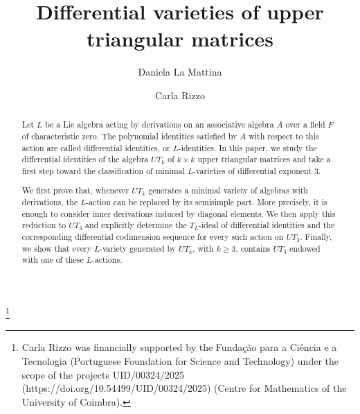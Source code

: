 \documentclass[a4paper,reqno]{amsart}
\theoremstyle{definition}
\numberwithin{equation}{section}
\numberwithin{theorem}{section}
\begin{document}
\title{Differential varieties of upper triangular matrices}

\author[D.~La~Mattina]{Daniela La Mattina}

\address{Daniela La Mattina, Dipartimento di Matematica e Informatica, Universit\'{a} degli Studi di Palermo, via
Archirafi 34, 90123, Palermo, Italy.}


\author[C.~Rizzo]{Carla Rizzo}
\address{Carla Rizzo, CMUC, Department of Mathematics, University of Coimbra, 3000-143
Coimbra, Portugal.}

 \thanks{Carla Rizzo was financially supported by the Fundação para a Ciência e a Tecnologia (Portuguese Foundation for Science and Technology) under the scope of the projects UID/00324/2025 (https://doi.org/10.54499/UID/00324/2025) (Centre for Mathematics of the University of Coimbra).}




\begin{abstract} 
Let $L$ be a Lie algebra acting by derivations on an associative algebra $A$ over a field $F$ of characteristic zero. The polynomial identities satisfied by $A$ with respect to this action are called differential identities, or $L$-identities. In this paper, we study the differential identities of the algebra $UT_k$ of $k\times k$ upper triangular matrices and take a first step toward the classification of minimal $L$-varieties of differential exponent $3$.

We first prove that, whenever $UT_k$ generates a minimal variety of algebras with derivations, the $L$-action can be replaced by its semisimple part. More precisely, it is enough to consider inner derivations induced by diagonal elements. We then apply this reduction to $UT_3$ and explicitly determine the $T_L$-ideal of differential identities and the corresponding differential codimension sequence for every such action on $UT_3$. Finally, we show that every $L$-variety generated by $UT_k$, with $k\geq 3$, contains $UT_3$ endowed with one of these $L$-actions.
\end{abstract}

\maketitle
 
\end{document}
